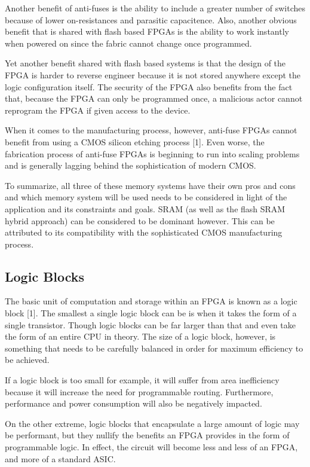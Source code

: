\documentclass{article}
\begin{document}
    Another benefit of anti-fuses is the ability to include a greater number of switches
    because of lower on-resistances and parasitic capacitence. Also,
    another obvious benefit that is shared with flash based FPGAs is the ability to
    work instantly when powered on since the fabric cannot change once programmed.

    Yet another benefit shared with flash based systems is that the design
    of the FPGA is harder to reverse engineer because it is not stored anywhere except
    the logic configuration itself. The security of the FPGA also benefits from the
    fact that, because the FPGA can only be programmed once, a malicious actor
    cannot reprogram the FPGA if given access to the device.

    When it comes to the manufacturing process, however, anti-fuse FPGAs cannot
    benefit from using a CMOS silicon etching process [1]. Even worse,
    the fabrication process of anti-fuse FPGAs is beginning to run into scaling problems
    and is generally lagging behind the sophistication of modern CMOS.

    To summarize, all three of these memory systems have their own pros and cons and
    which memory system will be used needs to be considered in light of the application
    and its constraints and goals. SRAM (as well as the flash SRAM hybrid approach) can
    be considered to be dominant however. This can be attributed to its compatibility
    with the sophisticated CMOS manufacturing process.
    
    \subsection{Logic Blocks}

    The basic unit of computation and storage within an FPGA is known as a logic block [1].
    The smallest a single logic block can be is when it takes the form of a single transistor.
    Though logic blocks can be far larger than that and even take the form of an entire
    CPU in theory. The size of a logic block, however, is something that needs to be carefully
    balanced in order for maximum efficiency to be achieved.

    If a logic block is too small for example, it will suffer from area inefficiency because
    it will increase the need for programmable routing. Furthermore, performance and
    power consumption will also be negatively impacted.

    On the other extreme, logic blocks that encapsulate a large amount of logic may
    be performant, but they nullify the benefits an FPGA provides in the form of programmable
    logic. In effect, the circuit will become less and less of an FPGA, and more of
    a standard ASIC.
\end{document}
